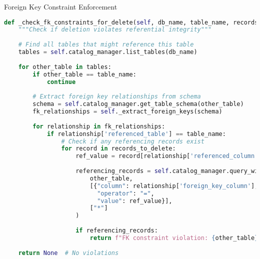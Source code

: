 \documentclass[aspectratio=169]{beamer}
\begin{document}
\begin{frame}[fragile]{Foreign Key Constraint Enforcement}
\begin{lstlisting}[language=Python]
def _check_fk_constraints_for_delete(self, db_name, table_name, records_to_delete):
    """Check if deletion violates referential integrity"""
    
    # Find all tables that might reference this table
    tables = self.catalog_manager.list_tables(db_name)
    
    for other_table in tables:
        if other_table == table_name:
            continue
            
        # Extract foreign key relationships from schema
        schema = self.catalog_manager.get_table_schema(other_table)
        fk_relationships = self._extract_foreign_keys(schema)
        
        for relationship in fk_relationships:
            if relationship['referenced_table'] == table_name:
                # Check if any referencing records exist
                for record in records_to_delete:
                    ref_value = record[relationship['referenced_column']]
                    
                    referencing_records = self.catalog_manager.query_with_condition(
                        other_table, 
                        [{"column": relationship['foreign_key_column'], 
                          "operator": "=", 
                          "value": ref_value}], 
                        ["*"]
                    )
                    
                    if referencing_records:
                        return f"FK constraint violation: {other_table} references {table_name}"
    
    return None  # No violations
\end{lstlisting}
\end{frame}
\end{document}
